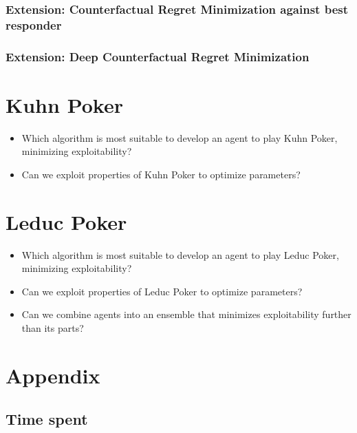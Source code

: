 \documentclass[10pt,a4paper]{article}
\begin{document}
\subsubsection{Extension: Counterfactual Regret Minimization against best responder}
\subsubsection{Extension: Deep Counterfactual Regret Minimization}


\section{Kuhn Poker}
\begin{tcolorbox}
\begin{itemize}
\item{Which algorithm is most suitable to develop an agent to play Kuhn Poker, minimizing exploitability?}
\item{Can we exploit properties of Kuhn Poker to optimize parameters?}
\end{itemize}
\end{tcolorbox}

\section{Leduc Poker}
\begin{tcolorbox}
\begin{itemize}
\item{Which algorithm is most suitable to develop an agent to play Leduc Poker, minimizing exploitability?}
\item{Can we exploit properties of Leduc Poker to optimize parameters?}
\item{Can we combine agents into an ensemble that minimizes exploitability further than its parts?}
\end{itemize}
\end{tcolorbox}




\section*{Appendix}
\subsection{Time spent}
\end{document}
